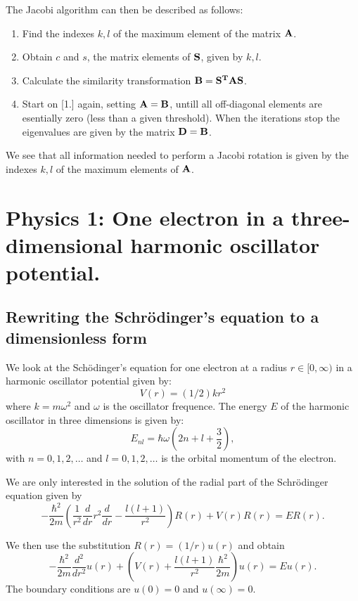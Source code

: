\documentclass[11pt,a4wide]{article}
\begin{document}
The Jacobi algorithm can then be described as follows: 
\begin{enumerate}
\item Find the indexes $k, l$ of the maximum element of the matrix $\bf A$.
\item Obtain $c$ and $s$, the matrix elements of $\bf S$, given by $k, l$.
\item Calculate the similarity transformation $\bf{B = S^TAS}$.
\item Start on [1.] again, setting $\bf {A = B}$, untill all off-diagonal elements are esentially zero (less than a given threshold). When the iterations stop the eigenvalues are given by the matrix $\bf {D = B}$.
\end{enumerate}

We see that all information needed to perform a Jacobi rotation is given by the indexes $k, l$ of the maximum elements of $\bf A$.

\section{Physics 1: One electron in a three-dimensional harmonic oscillator potential.}
\subsection{Rewriting the Schr\"odinger's equation to a dimensionless form}
We look at the Sch\"odinger's equation for one electron at a radius $r\in [0,\infty)$ in a harmonic oscillator potential given by: 
\[
V(r)= (1/2)kr^2
\]
where $k=m\omega^2$ and $\omega$ is the oscillator frequence. The energy $E$ of the harmonic oscillator in three dimensions is given by:
\[
E_{nl}=  \hbar \omega \left(2n+l+\frac{3}{2}\right),
\]
with $n=0,1,2,\dots$ and $l=0,1,2,\dots$ is the orbital momentum of the electron. 

We are only interested in the solution of the radial part of the Schr\"odinger equation given by
\begin{equation}
  -\frac{\hbar^2}{2 m} \left ( \frac{1}{r^2} \frac{d}{dr} r^2
  \frac{d}{dr} - \frac{l (l + 1)}{r^2} \right )R(r) 
     + V(r) R(r) = E R(r).
     \label{eq:schr_1}
\end{equation}

We then use the substitution $R(r) = (1/r) u(r)$ and obtain
\[
  -\frac{\hbar^2}{2 m} \frac{d^2}{dr^2} u(r) 
       + \left ( V(r) + \frac{l (l + 1)}{r^2}\frac{\hbar^2}{2 m}
                                    \right ) u(r)  = E u(r) .
\]
The boundary conditions are $u(0)=0$ and $u(\infty)=0$.
\end{document}
